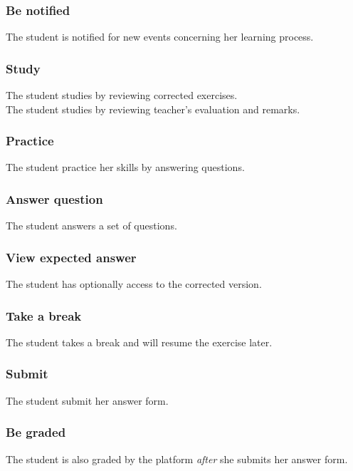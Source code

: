 		\subsubsection{Be notified}
			The student is notified for new events concerning her learning process.
		\subsubsection{Study}
			The student studies by reviewing corrected exercises.\\
			The student studies by reviewing teacher's evaluation and remarks.
		\subsubsection{Practice}
			The student practice her skills by answering questions.
		\subsubsection{Answer question}
			The student answers a set of questions.
		\subsubsection{View expected answer}
			The student has optionally access to the corrected version.
		\subsubsection{Take a break}
			The student takes a break and will resume the exercise later.
		\subsubsection{Submit}
			The student submit her answer form.
		\subsubsection{Be graded}
			The student is also graded by the platform \textit{after} she submits her answer form.		
